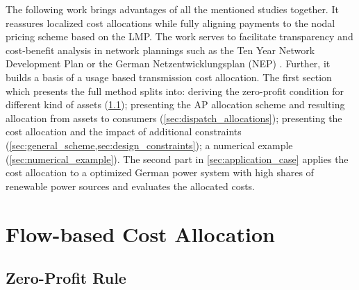 \documentclass[11pt,twocolumn]{article}
\begin{document}
The following work brings advantages of all the mentioned studies together. It reassures localized cost allocations while fully aligning payments to the nodal pricing scheme based on the LMP. The work serves to facilitate transparency and cost-benefit analysis in network plannings such as the Ten Year Network Development Plan \cite{entso-e_completing_2020} or the German Netzentwicklungsplan (NEP) \cite{bundesnetzagentur_netzentwicklungsplan_2020}. Further, it builds a basis of a usage based transmission cost allocation. The first section which presents the full method splits into: deriving the zero-profit condition for different kind of assets (\cref{sec:zero_profit_rule});  presenting the AP allocation scheme and resulting allocation from assets to consumers (\cref{sec:dispatch_allocations}); presenting the cost allocation and the impact of additional constraints (\cref{sec:general_scheme,sec:design_constraints}); a numerical example (\cref{sec:numerical_example}). The second part in \cref{sec:application_case} applies the cost allocation to a optimized German power system with high shares of renewable power sources and evaluates the allocated costs.  


\section{Flow-based Cost Allocation}

\subsection{Zero-Profit Rule}
\label{sec:zero_profit_rule}
\end{document}

